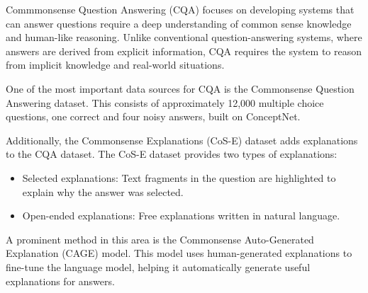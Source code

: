 Commmonsense Question Answering (CQA) focuses on developing systems that can answer questions require a deep understanding of common sense knowledge and human-like reasoning. Unlike conventional question-answering systems, where answers are derived from explicit information, CQA requires the system to reason from implicit knowledge and real-world situations.

One of the most important data sources for CQA is the Commonsense Question Answering dataset. This consists of approximately 12,000 multiple choice questions, one correct and four noisy answers, built on ConceptNet. 

Additionally, the Commonsense Explanations (CoS-E) dataset adds explanations to the CQA dataset. The CoS-E dataset provides two types of explanations:
\begin{itemize}
    \item Selected explanations: Text fragments in the question are highlighted to explain why the answer was selected.
    \item Open-ended explanations: Free explanations written in natural language.
\end{itemize}

A prominent method in this area is the Commonsense Auto-Generated Explanation (CAGE) model. This model uses human-generated explanations to fine-tune the language model, helping it automatically generate useful explanations for answers.
